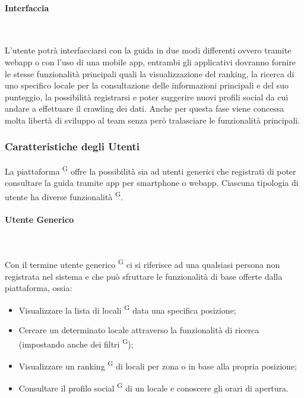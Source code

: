 \documentclass[letterpaper]{article}
\begin{document}
\paragraph{Interfaccia} \ \par\bigskip
L’utente potrà interfacciarsi con la guida in due modi differenti ovvero tramite webapp o con l’uso di una mobile app, entrambi gli applicativi dovranno fornire le stesse funzionalità principali quali la visualizzazione del ranking, la ricerca di uno specifico locale per la consultazione delle informazioni principali e del suo punteggio, la possibilità registrarsi e poter suggerire nuovi profili social da cui andare a effettuare il crawling dei dati.
Anche per questa fase viene concessa molta libertà di sviluppo al team senza però tralasciare le funzionalità principali.

\subsubsection{Caratteristiche degli Utenti}

La piattaforma \textsuperscript{G} offre la possibilità sia ad utenti generici che registrati di poter consultare la guida tramite app per smartphone o webapp. Ciascuna tipologia di utente ha diverse funzionalità \textsuperscript{G}.

\paragraph{Utente Generico} \ \par\bigskip

Con il termine utente generico \textsuperscript{G} ci si riferisce ad una qualsiasi persona non registrata nel sistema e che può sfruttare le funzionalità di base offerte dalla piattaforma, ossia:

\begin{itemize}
  \item Visualizzare la lista di locali \textsuperscript{G} data una specifica posizione;
  \item Cercare un determinato locale attraverso la funzionalità di ricerca (impostando anche dei filtri \textsuperscript{G});
  \item Visualizzare un ranking \textsuperscript{G} di locali per zona o in base alla propria posizione;
  \item Consultare il profilo social \textsuperscript{G} di un locale e conoscere gli orari di apertura.
\end{itemize}
\end{document}

